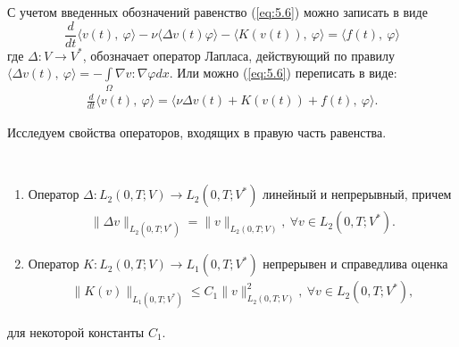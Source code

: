 С учетом введенных обозначений равенство (\ref{eq:5.6}) можно записать в виде
$$\frac{d}{dt} \langle v(t), \ \varphi \rangle - \nu\langle \Delta v(t) \varphi \rangle -
\langle K(v(t)), \ \varphi \rangle = \langle f(t), \ \varphi \rangle $$
где $\Delta: V \rightarrow V^\ast$, обозначает оператор Лапласа, действующий по правилу
$\langle \Delta v(t), \ \varphi \rangle=-\int\limits_\Omega \nabla v:\nabla\varphi dx.$
Или можно (\ref{eq:5.6}) переписать в виде:
\begin{equation}\label{eq:5.8}
    \begin{gathered}
        \frac{d}{dt} \langle v(t), \ \varphi \rangle = \langle \nu\Delta v(t)+K(v(t))+f(t), \ \varphi \rangle.
    \end{gathered}
\end{equation}

Исследуем свойства операторов, входящих в правую часть равенства.
\begin{lemma} ~\\
    \begin{enumerate}
        \item Оператор $\Delta: L_2(0, T; V) \rightarrow L_2(0, T; V^\ast)$ линейный и\linebreak
        непрерывный, причем
        \begin{equation}\label{eq:5.9}
            \begin{gathered}
                \| \Delta v \|_{L_2(0, T; V^\ast)} = \| v \|_{L_2(0, T; V)}, \ \forall v \in L_2(0, T; V^\ast).
            \end{gathered}
        \end{equation}
        \item Оператор $K: L_2(0, T; V) \rightarrow L_1(0, T; V^\ast)$ непрерывен и справедлива оценка
        \begin{equation}\label{eq:5.10}
            \begin{gathered}
                \| K(v) \|_{L_1(0, T; V^\ast)} \leqslant C_1\| v \|^2_{L_2(0, T;V)}, \ \forall v \in L_2(0, T; V^\ast),
            \end{gathered}
        \end{equation}
    \end{enumerate}
    для некоторой константы $C_1$.
\end{lemma}

